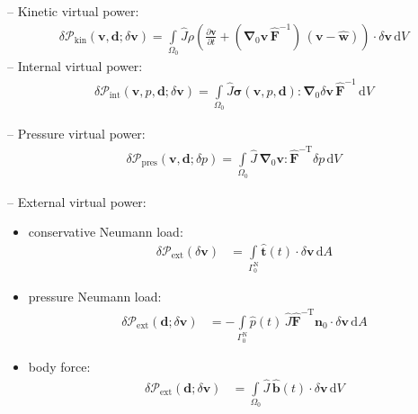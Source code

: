 \documentclass[a4paper,12pt]{report}
\newcommand{\bs}[1]{\boldsymbol{#1}}
\newcommand{\Om}{\mathit{\Omega}}
\newcommand{\Gm}{\mathit{\Gamma}}
\begin{document}
-- Kinetic virtual power:
\begin{equation}
\begin{aligned}
\delta \mathcal{P}_{\mathrm{kin}}(\bs{v},\bs{d};\delta\bs{v}) = \int\limits_{\Om_0} \widehat{J} \rho\left(\frac{\partial\bs{v}}{\partial t} + (\bs{\nabla}_{0}\bs{v}\,\widehat{\bs{F}}^{-1})\,(\bs{v}-\widehat{\bs{w}})\right) \cdot \delta\bs{v} \,\mathrm{d}V
\end{aligned}
\end{equation}
-- Internal virtual power:
\begin{equation}
\begin{aligned}
\delta \mathcal{P}_{\mathrm{int}}(\bs{v},p,\bs{d};\delta\bs{v}) = 
\int\limits_{\Om_0} \widehat{J}\bs{\sigma}(\bs{v},p,\bs{d}) : \bs{\nabla}_{0} \delta\bs{v}\,\widehat{\bs{F}}^{-1} \,\mathrm{d}V
\end{aligned}
\end{equation}

-- Pressure virtual power:
\begin{equation}
\begin{aligned}
\delta \mathcal{P}_{\mathrm{pres}}(\bs{v},\bs{d};\delta p) = 
\int\limits_{\Om_0} \widehat{J}\,\bs{\nabla}_{0}\bs{v} : \widehat{\bs{F}}^{-\mathrm{T}}\delta p\,\mathrm{d}V
\end{aligned}
\end{equation}

-- External virtual power:\\
\begin{itemize}
\item conservative Neumann load:
\begin{equation}
\begin{aligned}
\delta \mathcal{P}_{\mathrm{ext}}(\delta\bs{v}) &= \int\limits_{\Gm_0^{\mathrm{N}}} \hat{\bs{t}}(t) \cdot \delta\bs{v} \,\mathrm{d}A
\end{aligned}
\end{equation}
\item pressure Neumann load:
\begin{equation}
\begin{aligned}
\delta \mathcal{P}_{\mathrm{ext}}(\bs{d};\delta\bs{v}) &= -\int\limits_{\Gm_0^{\mathrm{N}}} \hat{p}(t)\,\widehat{J}\widehat{\bs{F}}^{-\mathrm{T}}\bs{n}_{0} \cdot \delta\bs{v} \,\mathrm{d}A 
\end{aligned}
\end{equation}
\item body force:
\begin{equation}
\begin{aligned}
\delta \mathcal{P}_{\mathrm{ext}}(\bs{d};\delta\bs{v}) &= \int\limits_{\Om_0} \widehat{J}\,\hat{\bs{b}}(t) \cdot \delta\bs{v} \,\mathrm{d}V
\end{aligned}
\end{equation}
\end{itemize}
\end{document}
